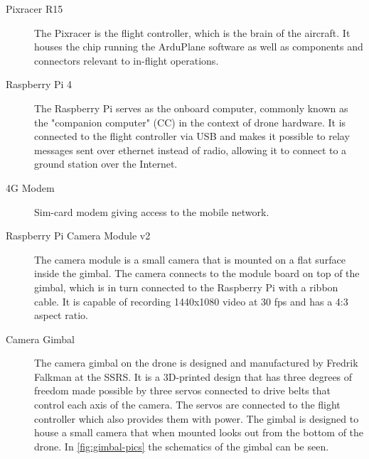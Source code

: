 \documentclass[nofilelist]{cslthse-msc}
\begin{document}
\begin{description}
   \item[Pixracer R15] The Pixracer is the flight controller, which is the brain of the aircraft. It houses the chip running the ArduPlane software as well as components and connectors relevant to in-flight operations.

   \item[Raspberry Pi 4] The Raspberry Pi serves as the onboard computer, commonly known as the "companion computer" (CC) in the context of drone hardware. It is connected to the flight controller via USB and makes it possible to relay messages sent over ethernet instead of radio, allowing it to connect to a ground station over the Internet. 
   
   \item[4G Modem] Sim-card modem giving access to the mobile network. 
   
   \item[Raspberry Pi Camera Module v2] The camera module is a small camera that is mounted on a flat surface inside the gimbal. The camera connects to the module board on top of the gimbal, which is in turn connected to the Raspberry Pi with a ribbon cable. It is capable of recording 1440x1080 video at 30 fps and has a 4:3 aspect ratio. 

   \item[Camera Gimbal] The camera gimbal on the drone is designed and manufactured by Fredrik Falkman at the SSRS. It is a 3D-printed design that has three degrees of freedom made possible by three servos connected to drive belts that control each axis of the camera. The servos are connected to the flight controller which also provides them with power. The gimbal is designed to house a small camera that when mounted looks out from the bottom of the drone. In \ref{fig:gimbal-pics} the schematics of the gimbal can be seen. 
   

\end{description}
\end{document}
